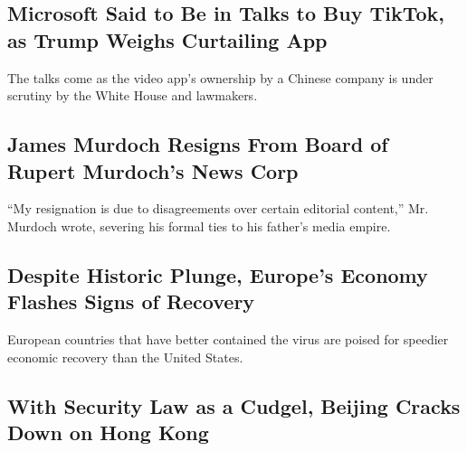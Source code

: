 \hypertarget{microsoft-said-to-be-in-talks-to-buy-tiktok-as-trump-weighs-curtailing-app}{%
\subsection{Microsoft Said to Be in Talks to Buy TikTok, as Trump Weighs
Curtailing
App}\label{microsoft-said-to-be-in-talks-to-buy-tiktok-as-trump-weighs-curtailing-app}}

The talks come as the video app's ownership by a Chinese company is
under scrutiny by the White House and lawmakers.

\href{/2020/07/31/business/media/james-murdoch-resigns-news-corp.html}{}

\hypertarget{james-murdoch-resigns-from-board-of-rupert-murdochs-news-corp}{%
\subsection{James Murdoch Resigns From Board of Rupert Murdoch's News
Corp}\label{james-murdoch-resigns-from-board-of-rupert-murdochs-news-corp}}

``My resignation is due to disagreements over certain editorial
content,'' Mr. Murdoch wrote, severing his formal ties to his father's
media empire.

\href{/2020/07/31/business/europe-economy-recovery-coronavirus.html}{}

\hypertarget{despite-historic-plunge-europes-economy-flashes-signs-of-recovery}{%
\subsection{Despite Historic Plunge, Europe's Economy Flashes Signs of
Recovery}\label{despite-historic-plunge-europes-economy-flashes-signs-of-recovery}}

European countries that have better contained the virus are poised for
speedier economic recovery than the United States.

\href{/2020/07/31/world/asia/hong-kong-election-national-security-law.html}{}

\hypertarget{with-security-law-as-a-cudgel-beijing-cracks-down-on-hong-kong}{%
\subsection{With Security Law as a Cudgel, Beijing Cracks Down on Hong
Kong}\label{with-security-law-as-a-cudgel-beijing-cracks-down-on-hong-kong}}

